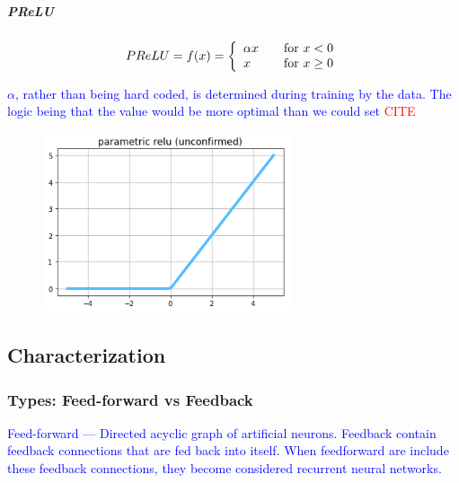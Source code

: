 \subparagraph{PReLU}

\begin{equ}[!ht]
	\begin{equation}
	{
		PReLU = f(x) = \left\{
		\begin{array}{ll}
		\alpha x & \quad $for$ \ x < 0 \\
		x & \quad $for$ \ x \ge 0
		\end{array}
		\right.
	}
	\label{eq:act_prelu_def}
	\end{equation}
	\caption{where $\alpha$ is a parameterized --- a learned parameter from training.}
\end{equ}

\textcolor{blue}{$\alpha$, rather than being hard coded, is determined during training by the data. The logic being that the value would be more optimal than we could set \textcolor{red}{CITE}}

\begin{figure}
	\centering
	\includegraphics[width=0.65\textwidth]{./sync_imgs/act/notsmooth/prelu.png}
	\label{fig:act_notsmooth_prelu}
\end{figure}









\subsection{Characterization}

\subsubsection{Types: Feed-forward vs Feedback}

\textcolor{blue}{Feed-forward --- Directed acyclic graph of artificial neurons. Feedback contain feedback connections that are fed back into itself. When feedforward are include these feedback connections, they become considered recurrent neural networks.}

